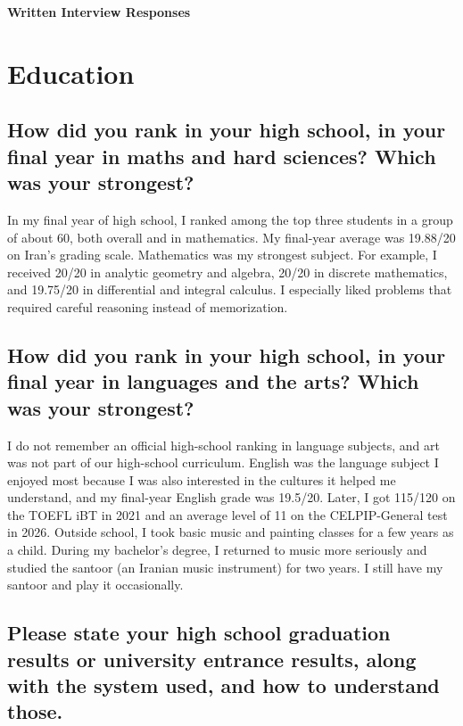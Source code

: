 \documentclass[11pt]{article}
\begin{document}
\begin{center}
    {\LARGE\bfseries\color{heading} Written Interview Responses}
\end{center}
\vspace{0.5em}

\section*{Education}

\subsection*{How did you rank in your high school, in your final year in maths and hard sciences? Which was your strongest?}

In my final year of high school, I ranked among the top three students in a group of about 60, both overall and in mathematics. My final-year average was 19.88/20 on Iran's grading scale. Mathematics was my strongest subject. For example, I received 20/20 in analytic geometry and algebra, 20/20 in discrete mathematics, and 19.75/20 in differential and integral calculus. I especially liked problems that required careful reasoning instead of memorization.

\subsection*{How did you rank in your high school, in your final year in languages and the arts? Which was your strongest?}

I do not remember an official high-school ranking in language subjects, and art was not part of our high-school curriculum. English was the language subject I enjoyed most because I was also interested in the cultures it helped me understand, and my final-year English grade was 19.5/20. Later, I got 115/120 on the TOEFL iBT in 2021 and an average level of 11 on the CELPIP-General test in 2026. Outside school, I took basic music and painting classes for a few years as a child. During my bachelor's degree, I returned to music more seriously and studied the santoor (an Iranian music instrument) for two years. I still have my santoor and play it occasionally.

\subsection*{Please state your high school graduation results or university entrance results, along with the system used, and how to understand those.}
\end{document}
